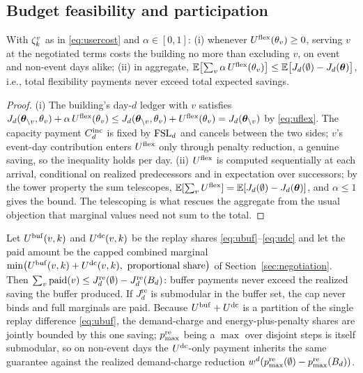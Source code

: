 \subsection{Budget feasibility and participation}

\begin{theorem}\label{thm:bf}
With $\zeta_{k}^{v}$ as in \eqref{eq:usercost} and
$\alpha \in [0,1]$: (i) whenever $U^{\mathrm{flex}}(\theta_v) \ge 0$, serving $v$
at the negotiated terms costs the building no more than excluding $v$,
on event and non-event days alike; (ii) in aggregate,
$\mathbb{E}\bigl[\sum_{v} \alpha\,U^{\mathrm{flex}}(\theta_v)\bigr] \le
\mathbb{E}\bigl[J_d(\emptyset) - J_d(\bm{\theta})\bigr]$, i.e., total
flexibility payments never exceed total expected savings.
\end{theorem}

\begin{proof}
(i) The building's day-$d$ ledger with $v$ satisfies
$J_d(\bm{\theta}_{\setminus v}, \theta_v) + \alpha\,U^{\mathrm{flex}}(\theta_v)
\le J_d(\bm{\theta}_{\setminus v}, \theta_v) + U^{\mathrm{flex}}(\theta_v) =
J_d(\bm{\theta}_{\setminus v})$ by \eqref{eq:uflex}. The capacity
payment $C_{d}^{\mathrm{inc}}$ is fixed by $\mathrm{FSL}_d$ and cancels between the two
sides; $v$'s event-day contribution enters $U^{\mathrm{flex}}$ only through
penalty reduction, a genuine saving, so the inequality holds per day.
(ii) $U^{\mathrm{flex}}$ is computed sequentially at each arrival, conditional on
realized predecessors and in expectation over successors; by the tower
property the sum telescopes,
$\mathbb{E}[\sum_v U^{\mathrm{flex}}] = \mathbb{E}[J_d(\emptyset) -
J_d(\bm{\theta})]$, and $\alpha \le 1$ gives the bound. The
telescoping is what rescues the aggregate from the usual objection
that marginal values need not sum to the total.
\end{proof}

\begin{lemma}\label{lem:replaybf}
Let $U^{\mathrm{buf}}(v,k)$ and $U^{\mathrm{dc}}(v,k)$ be the replay shares
\eqref{eq:ubuf}--\eqref{eq:udc} and let the paid amount be the capped
combined marginal $\min\bigl(U^{\mathrm{buf}}(v,k)+U^{\mathrm{dc}}(v,k),\ \text{proportional
share}\bigr)$ of Section~\ref{sec:negotiation}. Then
$\sum_{v} \text{paid}(v) \le J^{\mathrm{re}}_d(\emptyset) -
J^{\mathrm{re}}_d(B_{d})$: buffer payments never exceed the
realized saving the buffer produced. If $J^{\mathrm{re}}_d$ is
submodular in the buffer set, the cap never binds and full marginals
are paid. Because $U^{\mathrm{buf}}+U^{\mathrm{dc}}$ is a partition of the single replay
difference \eqref{eq:ubuf}, the demand-charge and energy-plus-penalty
shares are jointly bounded by this one saving; $p^{\mathrm{re}}_{\max}$ being a $\max$
over disjoint steps is itself submodular, so on non-event days the
$U^{\mathrm{dc}}$-only payment inherits the same guarantee against the realized
demand-charge reduction $w^{d}{}(p^{\mathrm{re}}_{\max}(\emptyset) - p^{\mathrm{re}}_{\max}(B_{d}))$.
\end{lemma}

